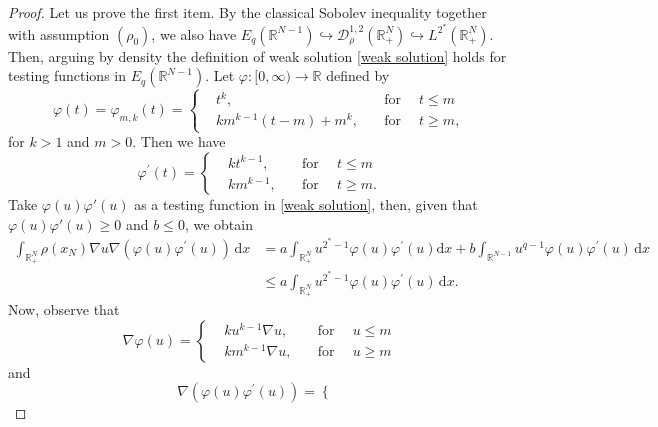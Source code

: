\documentclass[12pt,reqno]{amsart}
\begin{document}
\begin{proof} Let us prove the first item. By the classical Sobolev inequality together with assumption $(\rho_0)$, we also have $E_q(\mathds{R}^{N-1})\hookrightarrow \mathcal{D}^{1,2}_\rho(\mathds{R}^N_+)\hookrightarrow L^{2^\ast}(\mathds{R}^N_+)$. Then, arguing by density the definition of weak solution \eqref{weak solution} holds for testing functions in $E_q(\mathds{R}^{N-1})$. Let $\varphi:[0,\infty)\longrightarrow \mathds{R}$ defined by 
\begin{equation*}
    \varphi(t)= \varphi_{m,k}(t)=\left\lbrace
		\begin{aligned}
			&t^k,\quad&\mbox{for }&\,t\leq m\\
		&km^{k-1}(t-m)+m^k,\quad &\mbox{for}&\,t\geq m,
		\end{aligned}
		\right. 
\end{equation*}
for $k>1$ and $m>0$.
Then we have
\begin{equation*}
    \varphi^\prime(t)=\left\lbrace
		\begin{aligned}
			&kt^{k-1},\quad&\mbox{for }&\,t\leq m\\
		&km^{k-1},\quad &\mbox{for}&\,t\geq m.
		\end{aligned}
		\right. 
\end{equation*}
Take $\varphi(u)\varphi'(u)$ as a testing function in \eqref{weak solution}, then, given that $\varphi(u)\varphi'(u)\geq0$ and $b\leq 0$, we obtain 
\begin{align}\label{first inequality}
   \nonumber \int_{\mathds{R}^{N}_+}\rho(x_N)\nabla u \nabla (\varphi(u)\varphi^\prime(u)) \, \mathrm{d} x&=a\int_{\mathds{R}^{N}_+}u^{2^\ast-1}\varphi(u)\varphi^\prime(u) \mathrm{d}x  +b\int_{\mathds{R}^{N-1}}u^{q-1} \varphi(u)\varphi^\prime(u) \, \mathrm{d} x\\
    &\leq a\int_{\mathds{R}^{N}_+}u^{2^\ast-1} \varphi(u)\varphi^\prime(u) \, \mathrm{d} x.
\end{align}
Now, observe that
\begin{equation*}
    \nabla \varphi(u)=\left\lbrace
		\begin{aligned}
			&ku^{k-1}\nabla u,\quad&\mbox{for }&\,u\leq m\\
		&km^{k-1}\nabla u,\quad &\mbox{for}&\,u\geq m
		\end{aligned}
		\right. 
\end{equation*}
and
\begin{equation*}
    \nabla (\varphi(u)\varphi^\prime(u))=\left\lbrace
		\begin{aligned}

\end{aligned}
\end{equation*}
\end{proof}
\end{document}
